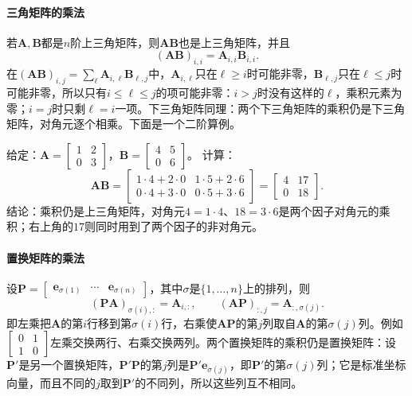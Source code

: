 \paragraph{三角矩阵的乘法}
若$\bm A,\bm B$都是$n$阶上三角矩阵，则$\bm A\bm B$也是上三角矩阵，并且
\[
 (\bm A\bm B)_{i,i}=\bm A_{i,i}\bm B_{i,i}.
\]
在$(\bm A\bm B)_{i,j}=\sum_\ell\bm A_{i,\ell}\bm B_{\ell,j}$中，$\bm A_{i,\ell}$只在$\ell\geq i$时可能非零，$\bm B_{\ell,j}$只在$\ell\leq j$时可能非零，所以只有$i\leq\ell\leq j$的项可能非零：$i>j$时没有这样的$\ell$，乘积元素为零；$i=j$时只剩$\ell=i$一项。下三角矩阵同理：两个下三角矩阵的乘积仍是下三角矩阵，对角元逐个相乘。下面是一个二阶算例。
\begin{example}[两个上三角矩阵的乘积]
\label{ex:ls-upper-triangular-product}
给定：$\bm A=\left[\begin{smallmatrix}1&2\\0&3\end{smallmatrix}\right]$，$\bm B=\left[\begin{smallmatrix}4&5\\0&6\end{smallmatrix}\right]$。
计算：
\[
 \bm A\bm B=\begin{bmatrix}1\cdot4+2\cdot0&1\cdot5+2\cdot6\\0\cdot4+3\cdot0&0\cdot5+3\cdot6\end{bmatrix}=\begin{bmatrix}4&17\\0&18\end{bmatrix}.
\]
结论：乘积仍是上三角矩阵，对角元$4=1\cdot4$、$18=3\cdot6$是两个因子对角元的乘积；右上角的$17$则同时用到了两个因子的非对角元。
\end{example}

\paragraph{置换矩阵的乘法}
设$\bm P=\left[\begin{smallmatrix}\bm e_{\sigma(1)}&\cdots&\bm e_{\sigma(n)}\end{smallmatrix}\right]$，其中$\sigma$是$\{1,\ldots,n\}$上的排列，则
\[
 (\bm P\bm A)_{\sigma(i),:}=\bm A_{i,:},\qquad(\bm A\bm P)_{:,j}=\bm A_{:,\sigma(j)}.
\]
即左乘把$\bm A$的第$i$行移到第$\sigma(i)$行，右乘使$\bm A\bm P$的第$j$列取自$\bm A$的第$\sigma(j)$列。例如$\left[\begin{smallmatrix}0&1\\1&0\end{smallmatrix}\right]$左乘交换两行、右乘交换两列。两个置换矩阵的乘积仍是置换矩阵：设$\bm P'$是另一个置换矩阵，$\bm P'\bm P$的第$j$列是$\bm P'\bm e_{\sigma(j)}$，即$\bm P'$的第$\sigma(j)$列；它是标准坐标向量，而且不同的$j$取到$\bm P'$的不同列，所以这些列互不相同。

